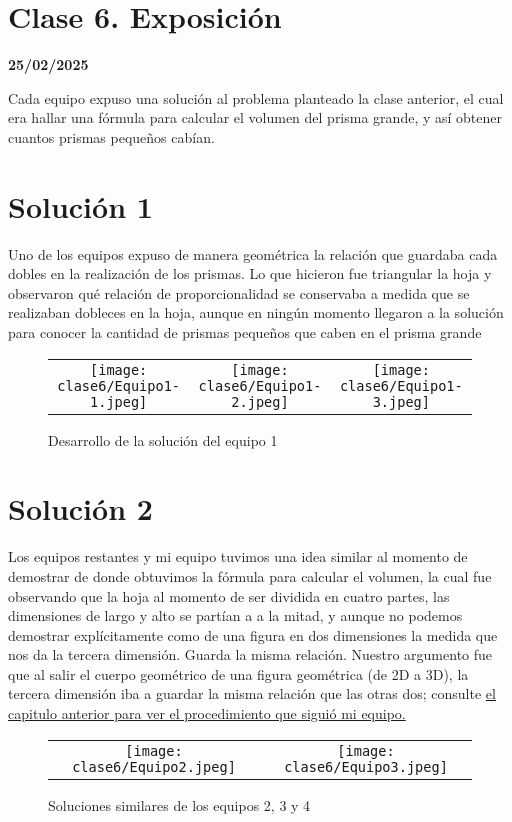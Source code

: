 \section{Clase 6. Exposición}
\textbf{25/02/2025}

Cada equipo expuso una solución al problema planteado la clase anterior, el cual era hallar una fórmula para calcular el volumen del prisma grande, y así obtener cuantos prismas pequeños cabían.

\section{Solución 1}
Uno de los equipos expuso de manera geométrica la relación que guardaba cada dobles en la realización de los prismas. Lo que hicieron fue triangular la hoja y observaron qué relación de proporcionalidad se conservaba a medida que se realizaban dobleces en la hoja, aunque en ningún momento llegaron a la solución para conocer la cantidad de prismas pequeños que caben en el prisma grande

\begin{center}
    \begin{figure}[H]
        \begin{tabular}{ccc}    
            \texttt{[image: clase6/Equipo1-1.jpeg]}&\texttt{[image: clase6/Equipo1-2.jpeg]}&\texttt{[image: clase6/Equipo1-3.jpeg]}
        \end{tabular}
        \caption{Desarrollo de la solución del equipo 1}
    \end{figure}
\end{center}

\section{Solución 2}

Los equipos restantes y mi equipo tuvimos una idea similar al momento de demostrar de donde obtuvimos la fórmula para calcular el volumen, la cual fue observando que la hoja al momento de ser dividida en cuatro partes, las dimensiones de largo y alto se partían a a la mitad, y aunque no podemos demostrar explícitamente como de una figura en dos dimensiones la medida que nos da la tercera dimensión. Guarda la misma relación. Nuestro argumento fue que al salir el cuerpo geométrico de una figura geométrica (de 2D a 3D), la tercera dimensión iba a guardar la misma relación que las otras dos; consulte \hyperref[chap:C5]{el capitulo anterior para ver el procedimiento que siguió mi equipo.}

\begin{figure}[H]
    \centering %
    \begin{tabular}{cc}
        \texttt{[image: clase6/Equipo2.jpeg]}&\texttt{[image: clase6/Equipo3.jpeg]}
    \end{tabular}
    \caption{Soluciones similares de los equipos 2, 3 y 4}
\end{figure}